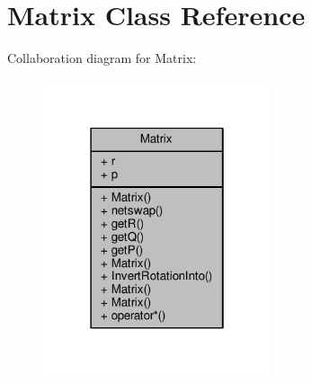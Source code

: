 \hypertarget{classMatrix}{}\section{Matrix Class Reference}
\label{classMatrix}


Collaboration diagram for Matrix\+:
\nopagebreak
\begin{figure}[H]
\begin{center}
\leavevmode
\includegraphics[width=190pt]{d9/d72/classMatrix__coll__graph}
\end{center}
\end{figure}
